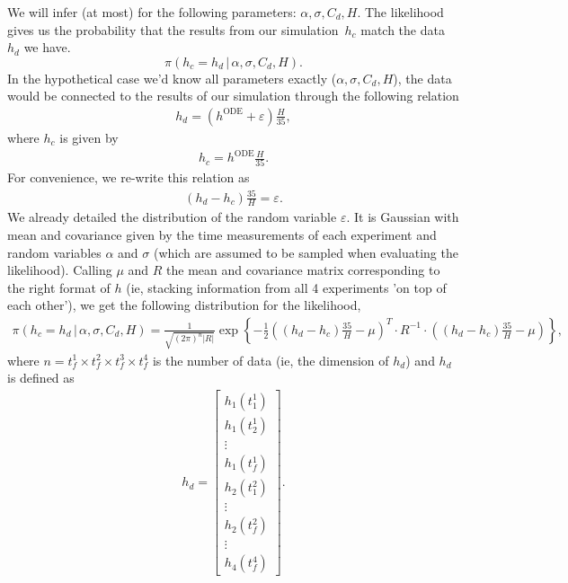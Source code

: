 \documentclass{article}
\begin{document}
We will infer (at most) for the following parameters: $\alpha, \sigma, C_d, H$. The likelihood gives us the probability that the results from our simulation~$h_c$ match the data~$h_d$ we have.
\[ \pi\left( h_c = h_d \, | \, \alpha, \sigma, C_d, H \right) .\]
In the hypothetical case we'd know all parameters exactly ($\alpha, \sigma, C_d, H$), the data would be connected to the results of our simulation through the following relation
\begin{align*}
 h_d = \left( h^\text{ODE} + \varepsilon \right) \frac{H}{35} , 
\end{align*}
where $h_c$ is given by
\begin{align*}
 h_c = h^\text{ODE} \frac{H}{35}.
\end{align*}
For convenience, we re-write this relation as
\begin{align*}
\left( h_d - h_c \right)\frac{35}H  = \varepsilon.
\end{align*}
We already detailed the distribution of the random variable $\varepsilon$. It is Gaussian with mean and covariance given by the time measurements of each experiment and random variables $\alpha$ and $\sigma$ (which are assumed to be sampled when evaluating the likelihood). Calling $\mu$ and $R$ the mean and covariance matrix corresponding to the right format of $h$ (ie, stacking information from all 4 experiments 'on top of each other'), we get the following distribution for the likelihood,
\begin{align*}
 \pi(h_c = h_d \, | \, \alpha, \sigma, C_d, H) = \frac1{\sqrt{(2\pi)^n |R|}} \exp \left\{ - \frac12 \left( \left( h_d - h_c \right)\frac{35}H - \mu \right)^T \cdotp R^{-1} \cdotp \left( \left( h_d - h_c \right)\frac{35}H - \mu \right) \right\} ,
\end{align*}
where $n = t_f^1 \times t_f^2 \times t_f^3 \times t_f^4$ is the number of data (ie, the dimension of $h_d$) and $h_d$ is defined as
\begin{align*}
 h_d = \begin{bmatrix}
h_1(t_1^1) \\
h_1(t_2^1) \\
\vdots \\
h_1 (t_f^1) \\
h_2(t_1^2) \\
\vdots \\
h_2(t_f^2) \\
\vdots \\
h_4(t_f^4) 
\end{bmatrix}.
\end{align*}
\end{document}
